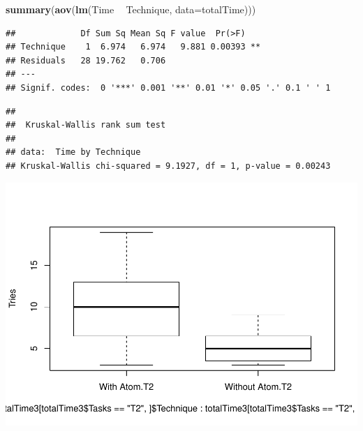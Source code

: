 \documentclass[]{article}
\newenvironment{Shaded}{\begin{snugshade}}{\end{snugshade}}
\newcommand{\DataTypeTok}[1]{\textcolor[rgb]{0.13,0.29,0.53}{#1}}
\newcommand{\DecValTok}[1]{\textcolor[rgb]{0.00,0.00,0.81}{#1}}
\newcommand{\KeywordTok}[1]{\textcolor[rgb]{0.13,0.29,0.53}{\textbf{#1}}}
\newcommand{\NormalTok}[1]{#1}
\newcommand{\OperatorTok}[1]{\textcolor[rgb]{0.81,0.36,0.00}{\textbf{#1}}}
\newcommand{\StringTok}[1]{\textcolor[rgb]{0.31,0.60,0.02}{#1}}
\begin{document}
\begin{Shaded}
\begin{Highlighting}[]
\KeywordTok{summary}\NormalTok{(}\KeywordTok{aov}\NormalTok{(}\KeywordTok{lm}\NormalTok{(Time }\OperatorTok{~}\StringTok{ }\NormalTok{Technique, }\DataTypeTok{data=}\NormalTok{totalTime)))}
\end{Highlighting}
\end{Shaded}

\begin{verbatim}
##             Df Sum Sq Mean Sq F value  Pr(>F)   
## Technique    1  6.974   6.974   9.881 0.00393 **
## Residuals   28 19.762   0.706                   
## ---
## Signif. codes:  0 '***' 0.001 '**' 0.01 '*' 0.05 '.' 0.1 ' ' 1
\end{verbatim}

\begin{verbatim}
## 
##  Kruskal-Wallis rank sum test
## 
## data:  Time by Technique
## Kruskal-Wallis chi-squared = 9.1927, df = 1, p-value = 0.00243
\end{verbatim}

\includegraphics{main_files/figure-latex/unnamed-chunk-31-1.pdf}

\begin{Shaded}
\end{Shaded}
\end{document}
